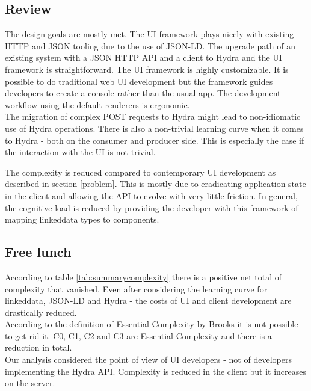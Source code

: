 \subsection{Review}
The design goals are mostly met. The UI framework plays nicely with existing HTTP and JSON tooling due to the use of JSON-LD. The upgrade path of an existing system with a JSON HTTP API and a client to Hydra and the UI framework is straightforward. The UI framework is highly customizable. It is possible to do traditional web UI development but the framework guides developers to create a \gls{console} rather than the usual app. The development workflow using the default renderers is ergonomic. \\
The migration of complex POST requests to Hydra might lead to non-idiomatic use of Hydra operations. There is also a non-trivial learning curve when it comes to Hydra - both on the consumer and producer side. This is especially the case if the interaction with the UI is not trivial.

The complexity is reduced compared to contemporary UI development as described in section \ref{problem}. This is mostly due to eradicating application state in the client and allowing the API to evolve with very little friction. In general, the cognitive load is reduced by providing the developer with this framework of mapping \gls{linkeddata} types to components.

\subsection{Free lunch}
According to table \ref{tab:summarycomplexity} there is a positive net total of complexity that vanished. Even after considering the learning curve for \gls{linkeddata}, JSON-LD and Hydra - the costs of UI and client development are drastically reduced. \\
According to the definition of Essential Complexity by Brooks it is not possible to get rid it. C0, C1, C2 and C3 are Essential Complexity and there is a reduction in total. \\
Our analysis considered the point of view of UI developers - not of developers implementing the Hydra API. Complexity is reduced in the client but it increases on the server.

